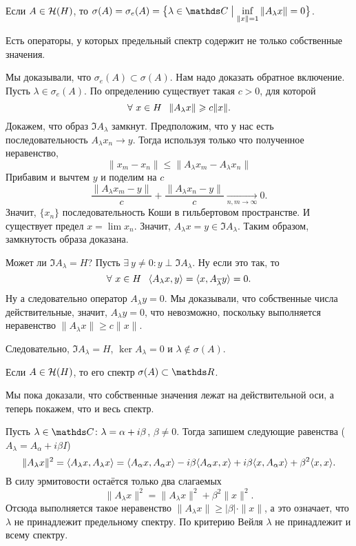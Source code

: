 \begin{Ut}
    Если $A\in\mathcal H(H)$, то $\sigma(A) = \sigma_e(A) = \big\{\lambda\in \C\bigm| \inf\limits_{\|x\|=1}\|A_\lambda x\| = 0\big\}$.
\end{Ut}
Есть операторы, у которых предельный спектр содержит не только собственные значения.
\begin{Proof}
Мы доказывали, что $\sigma_e(A)\subset \sigma(A)$. Нам надо доказать обратное включение. Пусть $\lambda\in \sigma_e(A)$. По определению существует такая $c>0$, для которой
\[
  \forall\ x\in H\pau \|A_\lambda x\|\ge c\|x\|.
\]
Докажем, что образ $\Im A_\lambda$ замкнут. Предположим, что у нас есть последовательность $A_\lambda x_n\to y$. Тогда используя только что полученное неравенство,
\[
  \|x_m - x_n\|\le \| A_\lambda x_m - A_\lambda x_n\|
\]
Прибавим и вычтем $y$ и поделим на $c$
\[
  \frac{\|A_\lambda x_m - y\|}c + \frac{\|A_\lambda x_n - y\|}c \xrightarrow[n,m\to\infty]{ }0.
\]
Значит, $\{x_n\}$ последовательность Коши в гильбертовом пространстве. И существует предел $x = \lim x_n$. Значит, $A_\lambda x = y\in \Im A_\lambda$. Таким образом, замкнутость образа доказана.

Может ли $\Im A_\lambda = H$? Пусть $\exists\ y\ne 0\colon y\perp \Im A_\lambda$. Ну если это так, то
\[
  \forall\ x\in H\pau\la A_\lambda x,y\ra = \la x, A_{\ol\lambda}y\ra = 0.
\]
Ну а следовательно оператор $A_\lambda y = 0$. Мы доказывали, что собственные числа действительные, значит, $A_\lambda y = 0$, что невозможно, поскольку выполняется неравенство $\|A_\lambda x\|\ge c\|x\|$.

Следовательно, $\Im A_\lambda = H$, $\ker A_\lambda=0$ и $\lambda\not\in\sigma(A)$.
\end{Proof}
\begin{Ut}
  Если $A\in \mathcal H(H)$, то его спектр $\sigma(A)\subset\R$.
\end{Ut}
Мы пока доказали, что собственные значения лежат на действительной оси, а теперь покажем, что и весь спектр.
\begin{Proof}
Пусть $\lambda\in\C\colon \lambda = \alpha + i\beta$, $\beta\ne0$. Тогда запишем следующие равенства ($A_\lambda = A_\alpha + i \beta I$)
\[
  \|A_\lambda x\|^2 = \langle A_\lambda x,A_\lambda x\rangle = 
   \langle A_\alpha x, A_\alpha x\rangle - i\beta \langle A_\alpha x,x\rangle + i\beta\langle x, A_\alpha x\rangle + \beta^2\langle x,x\rangle.
\]
В силу эрмитовости остаётся только два слагаемых
\[
  \|A_\lambda x\|^2  = \|A_\lambda x\|^2 + \beta^2 \|x\|^2.
\]
Отсюда выполняется такое неравенство $\|A_\lambda x\|\ge |\beta|\cdot \|x\|$, а это означает, что $\lambda$ не принадлежит предельному спектру. По критерию Вейля $\lambda$ не принадлежит и всему спектру.
\end{Proof}
